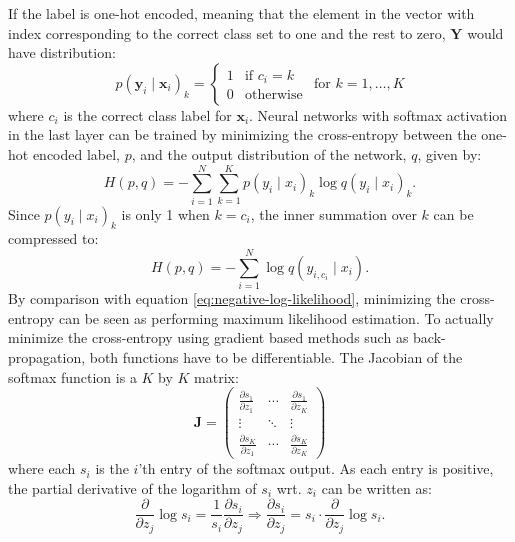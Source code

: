 \documentclass[a4paper,11pt]{article} %
\begin{document}
If the label is one-hot encoded, meaning that the element in the vector with index corresponding to the correct class set to one and the rest to zero, $\mathbf{Y}$ would have distribution:
\begin{equation}
  p(\mathbf{y}_i \mid \mathbf{x}_i)_k = \begin{cases}
    1 & \text{if } c_{i} = k \\
    0 & \text{otherwise}
  \end{cases} \hspace{5pt} \text{for } k = 1, \ldots, K
\end{equation}
where $c_i$ is the correct class label for $\mathbf{x}_i$. Neural networks with softmax activation in the last layer can be trained by minimizing the cross-entropy between the one-hot encoded label, $p$, and the output distribution of the network, $q$, given by:
\begin{equation}
  H(p, q) = - \sum_{i=1}^N \sum_{k=1}^K p(y_i \mid x_i)_k \log q(y_i \mid x_i)_k.
\end{equation}
Since $p(y_i \mid x_i)_k$ is only 1 when $k=c_i$, the inner summation over $k$ can be compressed to:
\begin{equation}
  H(p, q) = - \sum_{i=1}^N \log q(y_{i,c_i} \mid x_i).
\end{equation}
By comparison with equation \ref{eq:negative-log-likelihood}, minimizing the cross-entropy can be seen as performing maximum likelihood estimation. To actually minimize the cross-entropy using gradient based methods such as back-propagation, both functions have to be differentiable. The Jacobian of the softmax function is a $K$ by $K$ matrix:
\begin{equation}
  \mathbf{J} = \left( 
    \begin{matrix}
      \frac{\partial s_1}{\partial z_1} & \cdots & \frac{\partial s_1}{\partial z_K}\\
      \vdots & \ddots & \vdots \\
      \frac{\partial s_K}{\partial z_1} & \cdots & \frac{\partial s_K}{\partial z_K}
    \end{matrix} 
  \right)
\end{equation}
where each $s_i$ is the $i$'th entry of the softmax output. As each entry is positive, the partial derivative of the logarithm of $s_i$ wrt. $z_i$ can be written as:
\begin{equation} \label{eq:softmax-derivative}
  \frac{\partial}{\partial z_j} \log s_i = \frac{1}{s_i} \frac{\partial s_i}{\partial z_j}
  \Rightarrow \frac{\partial s_i}{\partial z_j} = s_i \cdot \frac{\partial}{\partial z_j} \log s_i.
\end{equation}
\end{document}
